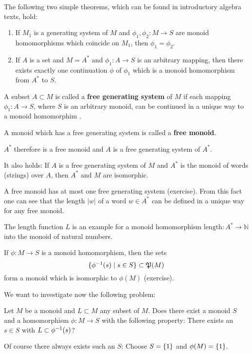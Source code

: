 The following two simple theorems, which can be found in introductory algebra
texts, hold:
\begin{enumerate}
  \item If $M_1$ is a generating system of $M$ and $\phi_1, \phi_2 : M \to S$
  are monoid homomorphisms which coincide on $M_1$, then $\phi_1 = \phi_2$.
  
  \item If $A$ is a set and $M = A^*$ and $\phi_1 : A \to S$ is an arbitrary
  mapping, then there exists exactly one continuation $\phi$ of $\phi_1$
  which is a monoid homomorphism from $A^*$ to $S$.
\end{enumerate}

\begin{definition}
A subset $A \subset M$ is called a {\bf free generating system} of $M$ if each
mapping $\phi_1 : A \to S$, where $S$ is an arbitrary monoid, can be continued
in a unique way to a monoid homomorphim . 
\end{definition}

A monoid which has a free generating system is called a {\bf free monoid}.

$A^*$ therefore is a free monoid and $A$ is a free generating system of $A^*$.

It also holds: If $A$ is a free generating system of $M$ and $A^*$ is the
monoid of words (strings) over $A$, then $A^*$ and $M$ are isomorphic.

A free monoid has at most one free generating system (exercise). From this fact
one can see that the length $|w|$ of a word $w \in A^*$ can be defined in a 
unique way for any free monoid.

The length function $L$ is an example for a monoid homomorphism $\mathrm{length}
: A^* \to \mathbb{N}$ into the monoid of natural numbers.

If $\phi : M \to S$ is a monoid homomorphism, then the sets 
\[ \mbox{$\{\mbox{${\phi}^{-1}$}(s) \mid s \in S\}$} \subset \mathfrak{P}({M}) \]
form a monoid which is isomorphic to $\phi(M)$ (exercise).

We want to investigate now the following problem:

Let $M$ be a monoid and $L \subset M$ any subset of $M$. Does there exist a
monoid $S$ and a homomorphism $\phi : M \to S$ with the following property:
There exists an $s \in S$ with $L \subset \mbox{${\phi}^{-1}$}(s)$?

Of course there always exists such an $S$: Choose $S = \mbox{$\{1\}$}$ and
$\phi(M) = \mbox{$\{1\}$}$. 

